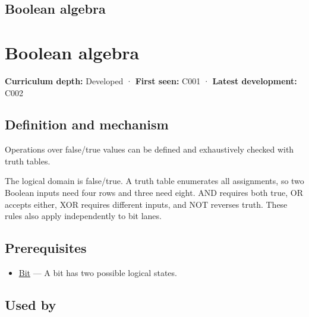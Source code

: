 \hypertarget{appendix-24475e1596a8}{}
\section*{Boolean algebra}
\chapter{Boolean algebra}\label{appendix-24475e1596a8-boolean-algebra}

\textbf{Curriculum depth:} Developed · \textbf{First seen:} C001 · \textbf{Latest development:} C002

\section{Definition and mechanism}\label{appendix-24475e1596a8-definition-and-mechanism}

Operations over false/true values can be defined and exhaustively checked with truth tables.

The logical domain is false/true. A truth table enumerates all assignments, so two Boolean inputs need four rows and three need eight. AND requires both true, OR accepts either, XOR requires different inputs, and NOT reverses truth. These rules also apply independently to bit lanes.

\section{Prerequisites}\label{appendix-24475e1596a8-prerequisites}

\begin{itemize}
\tightlist
\item
  \hyperref[appendix-ddbb69998a2e]{Bit} --- A bit has two possible logical states.
\end{itemize}

\section{Used by}\label{appendix-24475e1596a8-used-by}

